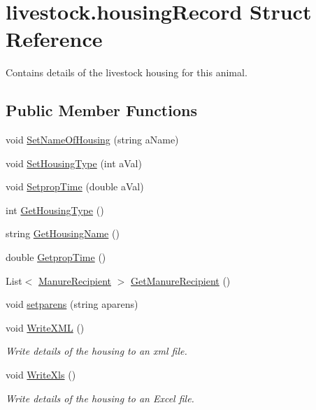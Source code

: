 \hypertarget{structlivestock_1_1housing_record}{}\section{livestock.\+housing\+Record Struct Reference}
\label{structlivestock_1_1housing_record}


Contains details of the livestock housing for this animal.  


\subsection*{Public Member Functions}
\begin{DoxyCompactItemize}
\item 
void \mbox{\hyperlink{structlivestock_1_1housing_record_a1584b585f3700377ed06cb5e199970f0}{Set\+Name\+Of\+Housing}} (string a\+Name)
\item 
void \mbox{\hyperlink{structlivestock_1_1housing_record_ae8703e7b5e61aaecbe5098e01c000710}{Set\+Housing\+Type}} (int a\+Val)
\item 
void \mbox{\hyperlink{structlivestock_1_1housing_record_a70d301e211d1336e5248c9e45a896295}{Setprop\+Time}} (double a\+Val)
\item 
int \mbox{\hyperlink{structlivestock_1_1housing_record_a0b5101b80fc1282f44ced192e88f5efa}{Get\+Housing\+Type}} ()
\item 
string \mbox{\hyperlink{structlivestock_1_1housing_record_a776bdf58427bb435133756bbfa7f5a95}{Get\+Housing\+Name}} ()
\item 
double \mbox{\hyperlink{structlivestock_1_1housing_record_a64e33341781a02a312e434fd06ed49c2}{Getprop\+Time}} ()
\item 
List$<$ \mbox{\hyperlink{structlivestock_1_1_manure_recipient}{Manure\+Recipient}} $>$ \mbox{\hyperlink{structlivestock_1_1housing_record_a1b462d25daa74854b8da6f06d2cf0b54}{Get\+Manure\+Recipient}} ()
\item 
void \mbox{\hyperlink{structlivestock_1_1housing_record_a73be90de90bf0fba9dc44118d3fb7eda}{setparens}} (string aparens)
\item 
void \mbox{\hyperlink{structlivestock_1_1housing_record_aba0d1eaad98d4e6170a83bbcfff59f59}{Write\+X\+ML}} ()
\begin{DoxyCompactList}\small\item\em Write details of the housing to an xml file. \end{DoxyCompactList}\item 
void \mbox{\hyperlink{structlivestock_1_1housing_record_a0c25cd76b2003cbe7084790ddc7470b7}{Write\+Xls}} ()
\begin{DoxyCompactList}\small\item\em Write details of the housing to an Excel file. \end{DoxyCompactList}\end{DoxyCompactItemize}
